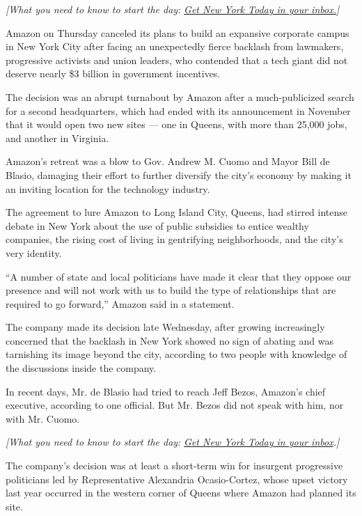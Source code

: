 \emph{{[}What you need to know to start the day:}
\href{https://www.nytimes.com/newsletters/newyorktoday?module=inline}{\emph{Get
New York Today in your inbox.}}\emph{{]}}

Amazon on Thursday canceled its plans to build an expansive corporate
campus in New York City after facing an unexpectedly fierce backlash
from lawmakers, progressive activists and union leaders, who contended
that a tech giant did not deserve nearly \$3 billion in government
incentives.

The decision was an abrupt turnabout by Amazon after a much-publicized
search for a second headquarters, which had ended with its announcement
in November that it would open two new sites --- one in Queens, with
more than 25,000 jobs, and another in Virginia.

Amazon's retreat was a blow to Gov. Andrew M. Cuomo and Mayor Bill de
Blasio, damaging their effort to further diversify the city's economy by
making it an inviting location for the technology industry.

The agreement to lure Amazon to Long Island City, Queens, had stirred
intense debate in New York about the use of public subsidies to entice
wealthy companies, the rising cost of living in gentrifying
neighborhoods, and the city's very identity.

``A number of state and local politicians have made it clear that they
oppose our presence and will not work with us to build the type of
relationships that are required to go forward,'' Amazon said in a
statement.

The company made its decision late Wednesday, after growing increasingly
concerned that the backlash in New York showed no sign of abating and
was tarnishing its image beyond the city, according to two people with
knowledge of the discussions inside the company.

In recent days, Mr. de Blasio had tried to reach Jeff Bezos, Amazon's
chief executive, according to one official. But Mr. Bezos did not speak
with him, nor with Mr. Cuomo.

\emph{{[}What you need to know to start the day:}
\href{https://www.nytimes.com/newsletters/newyorktoday?module=inline}{\emph{Get
New York Today in your inbox}}\emph{.{]}}

The company's decision was at least a short-term win for insurgent
progressive politicians led by Representative Alexandria Ocasio-Cortez,
whose upset victory last year occurred in the western corner of Queens
where Amazon had planned its site.

